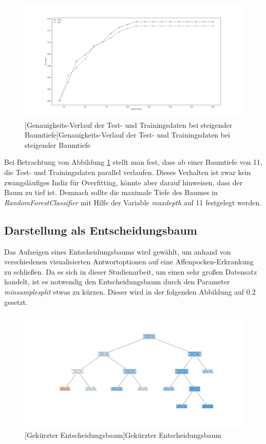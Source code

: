 \documentclass[13pt,a4paper, listof=entryprefix, bibliography=totocnumbered,toc=listofnumbered,lof=listofnumbered]{scrartcl}
\begin{document}
	\begin{figure}[H]
		\centering
		\includegraphics[width=0.8\linewidth]{Bilder/overfitting_plot.png}
		[Genauigkeits-Verlauf der Test- und Trainingsdaten bei steigender Baumtiefe]{Genauigkeits-Verlauf der Test- und Trainingsdaten bei steigender Baumtiefe}
		\label{fig:overfitting}
	\end{figure}

Bei Betrachtung von Abbildung \ref{fig:overfitting} stellt man fest, dass ab einer Baumtiefe von 11, die Test- und Trainingsdaten parallel 
verlaufen. Dieses Verhalten ist zwar kein zwangsläufiges Indiz für Overfitting, könnte aber darauf hinweisen, dass der Baum zu tief ist.
Demnach sollte die maximale Tiefe des Baumes in \textit{RandomForestClassifier} mit Hilfe der Variable \textit{max\textunderscore depth} auf 11 festgelegt werden.  


	\subsection{Darstellung als Entscheidungsbaum}
		\label{ch:entscheidungsbaum}

Das Aufzeigen eines Entscheidungsbaums wird gewählt, um anhand von verschiedenen visualisierten Antwortoptionen auf eine Affenpocken-Erkrankung zu schließen.
Da es sich in dieser Studienarbeit, um einen sehr großen Datensatz handelt, ist es notwendig den Entscheidungsbaum durch den Parameter \textit{min\textunderscore sample\textunderscore split}
etwas zu kürzen. Dieser wird in der folgenden Abbildung auf 0.2 gesetzt. 

	\begin{figure}[H]
		\centering
		\includegraphics[width=0.8\linewidth]{Bilder/decision_tree.png}
		[Gekürzter Entscheidungsbaum]{Gekürzter Entscheidungsbaum}
		\label{fig:decisiontree}
	\end{figure}
\end{document}
